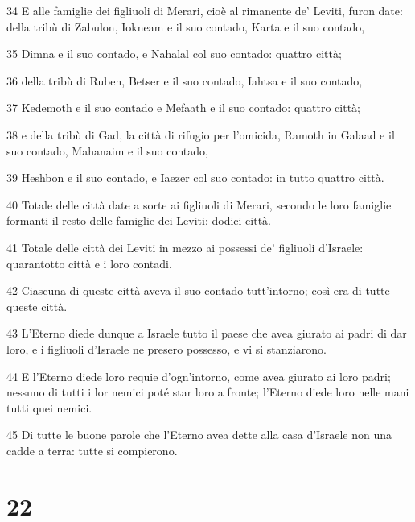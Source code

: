 \par 34 E alle famiglie dei figliuoli di Merari, cioè al rimanente de' Leviti, furon date: della tribù di Zabulon, Iokneam e il suo contado, Karta e il suo contado,
\par 35 Dimna e il suo contado, e Nahalal col suo contado: quattro città;
\par 36 della tribù di Ruben, Betser e il suo contado, Iahtsa e il suo contado,
\par 37 Kedemoth e il suo contado e Mefaath e il suo contado: quattro città;
\par 38 e della tribù di Gad, la città di rifugio per l'omicida, Ramoth in Galaad e il suo contado, Mahanaim e il suo contado,
\par 39 Heshbon e il suo contado, e Iaezer col suo contado: in tutto quattro città.
\par 40 Totale delle città date a sorte ai figliuoli di Merari, secondo le loro famiglie formanti il resto delle famiglie dei Leviti: dodici città.
\par 41 Totale delle città dei Leviti in mezzo ai possessi de' figliuoli d'Israele: quarantotto città e i loro contadi.
\par 42 Ciascuna di queste città aveva il suo contado tutt'intorno; così era di tutte queste città.
\par 43 L'Eterno diede dunque a Israele tutto il paese che avea giurato ai padri di dar loro, e i figliuoli d'Israele ne presero possesso, e vi si stanziarono.
\par 44 E l'Eterno diede loro requie d'ogn'intorno, come avea giurato ai loro padri; nessuno di tutti i lor nemici poté star loro a fronte; l'Eterno diede loro nelle mani tutti quei nemici.
\par 45 Di tutte le buone parole che l'Eterno avea dette alla casa d'Israele non una cadde a terra: tutte si compierono.

\chapter{22}

